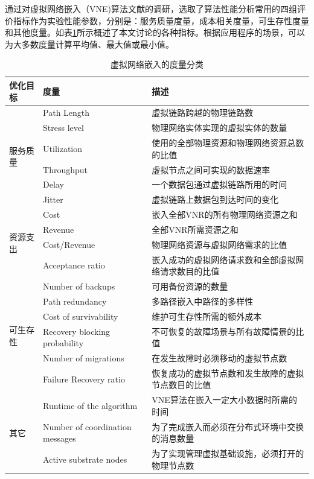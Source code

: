 通过对虚拟网络嵌入（VNE)算法文献的调研，选取了算法性能分析常用的四组评价指标作为实验性能参数，分别是：服务质量度量，成本相关度量，可生存性度量和其他度量。如表\ref{tab:MetricsForVirtualNetworkEmbedding}所示概述了本文讨论的各种指标。根据应用程序的场景，可以为大多数度量计算平均值、最大值或最小值。
\begin{table}[htb]
\caption{虚拟网络嵌入的度量分类}\label{tab:MetricsForVirtualNetworkEmbedding}
\vspace{0.5em}\centering\wuhao
\begin{tabular}{lll}
\toprule[1.5pt]
优化目标  & 度量   & 描述  \\
\midrule[1pt]
\multirow{6}{*}{服务质量} & Path Length  & 虚拟链路跨越的物理链路数\\
 & Stress level  & 物理网络实体实现的虚拟实体的数量\\
 & Utilization & 使用的全部物理资源和物理网络资源总数的比值\\
 & Throughput & 虚拟节点之间可实现的数据速率\\
 & Delay  & 一个数据包通过虚拟链路所用的时间
\\
 & Jitter  & 虚拟链路上数据包到达时间的变化\\
\hline
\multirow{4}{*}{资源支出} & Cost  & 嵌入全部VNR的所有物理网络资源之和\\
 & Revenue  & 全部VNR所需资源之和\\
 & Cost/Revenue & 物理网络资源与虚拟网络需求的比值\\
 & Acceptance ratio & 嵌入成功的虚拟网络请求数和全部虚拟网络请求数目的比值\\
\hline
\multirow{6}{*}{可生存性} & Number of backups  &可用备份资源的数量\\
 & Path redundancy  & 多路径嵌入中路径的多样性\\
 & Cost of survivability & 维护可生存性所需的额外成本\\
 & Recovery blocking probability & 不可恢复的故障场景与所有故障情景的比值\\
 & Number of migrations  & 在发生故障时必须移动的虚拟节点数\\
 & Failure Recovery ratio  & 恢复成功的虚拟节点数和发生故障的虚拟节点数目的比值\\
\hline
\multirow{3}{*}{其它} & Runtime of the algorithm  & VNE算法在嵌入一定大小数据时所需的时间\\
 & Number of coordination messages  & 为了完成嵌入而必须在分布式环境中交换的消息数量\\
 & Active substrate nodes & 为了实现管理虚拟基础设施，必须打开的物理节点数\\
\bottomrule[1.5pt]
\end{tabular}
\vspace{\baselineskip}
\end{table}


